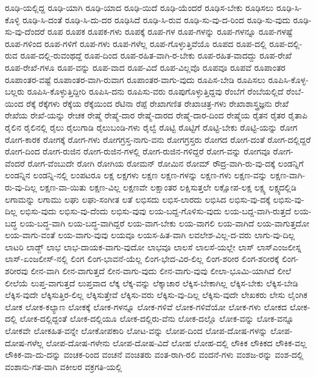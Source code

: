 {ರೂಢಿ-ಯಲ್ಲಿದ್ದ
ರೂಢಿ-ಯಾಗಿ
ರೂಢಿ-ಯಾದ
ರೂಢಿ-ಯಿದೆ
ರೂಢಿ-ಯೆಂದರೆ
ರೂಢಿಸ-ಬೇಕು
ರೂಢಿಸಲು
ರೂಢಿ-ಸಿ-ಕೊಳ್ಳಿ
ರೂಢಿ-ಸಿ-ದಂತೆ
ರೂಢಿ-ಸಿ-ದು-ದರ
ರೂಢಿಸಿದೆ
ರೂಢಿ-ಸಿ-ರುವ
ರೂಢಿ-ಸು-ವು-ದ-ರಿಂದ
ರೂಢಿ-ಸು-ವುದು
ರೂಢಿ-ಸು-ವು-ದೆಂದರೆ
ರೂಪ
ರೂಪಕ
ರೂಪಕ-ಗಳು
ರೂಪಕ್ಕೆ
ರೂಪ-ಗಳ
ರೂಪ-ಗಳನ್ನು
ರೂಪ-ಗಳನ್ನೂ
ರೂಪ-ಗಳಷ್ಟೆ
ರೂಪ-ಗಳಿಂದ
ರೂಪ-ಗಳಿಗೆ
ರೂಪ-ಗಳು
ರೂಪ-ಗಳೆಲ್ಲ
ರೂಪ-ಗೊಳ್ಳುತ್ತಿವೆಯೊ
ರೂಪದ
ರೂಪ-ದಲ್ಲಿ
ರೂಪ-ದಲ್ಲಿ-ರುವ
ರೂಪ-ದಲ್ಲಿ-ರುವಂಥದ್ದೆ
ರೂಪ-ದಿಂದ
ರೂಪ-ರಹಿತ-ವಾಗಿ-ರ-ಬೇಕು
ರೂಪ-ರಹಿತ-ವಾದದ್ದು
ರೂಪ-ರೇಖೆ
ರೂಪ-ರೇಖೆ-ಗಳೂ
ರೂಪ-ವನ್ನು
ರೂಪ-ವಾದ
ರೂಪ-ವಿದೆ
ರೂಪ-ವಿಲ್ಲವೊ
ರೂಪವೂ
ರೂಪವೆ
ರೂಪಾಂತರ
ರೂಪಾಂತರ-ವಷ್ಟೆ
ರೂಪಾಂತರ-ವಾಗಿ-ರುವಾಗ
ರೂಪಾಂತರ-ವಾಗು-ವುದು
ರೂಪಿಸ-ಬೇಡಿ
ರೂಪಿಸಲು
ರೂಪಿಸಿ-ಕೊಳ್ಳ-ಬಲ್ಲರು
ರೂಪಿಸಿ-ಕೊಳ್ಳುತ್ತಿದ್ದೀರಿ
ರೂಪಿಸಿ-ದನು
ರೂಪಿಸು-ವರು
ರೂಪುಗೊಳ್ಳುತ್ತಿದ್ದವು
ರೆಂಬೆಗೆ
ರೆಂಬೆಯಲ್ಲಿದೆ
ರೆಂಬೆ-ಯಿಂದ
ರೆಕ್ಕೆ
ರೆಕ್ಕೆಗಳು
ರೆಕ್ಕೆಯ
ರೆಕ್ಕೆಯಿಂದ
ರೆಟಿನಾ
ರೆಪ್ಪೆ
ರೇಖಾಗಣಿತ
ರೇಖಾಚಿತ್ರ-ಗಳು
ರೇಖಾಶಾಸ್ತ್ರಜ್ಞನು
ರೇಖೆ
ರೇಖೆಯ
ರೇಖೆ-ಯನ್ನು
ರೇಚಕ
ರೇಷ್ಮೆ
ರೇಷ್ಮೆ-ದಾರ
ರೇಷ್ಮೆ-ದಾರದ
ರೇಷ್ಮೆ-ದಾರ-ದಿಂದ
ರೇಷ್ಮೆಯ
ರೈತನ
ರೈತರ
ರೈತಾಪಿ
ರೈಲಿನ
ರೈಲಿನಲ್ಲಿ
ರೈಲು
ರೈಲುಗಾಡಿ
ರೈಲುಬಂಡಿ-ಗಳು
ರೈಲ್ವೆ
ರೊಟ್ಟಿ
ರೊಟ್ಟಿಗೆ
ರೊಟ್ಟಿ-ಬೇಕು
ರೊಟ್ಟಿ-ಯನ್ನು
ರೋಗ
ರೋಗ-ಕಾರಕ
ರೋಗಕ್ಕೆ
ರೋಗ-ಗಳು
ರೋಗಗ್ರಸ್ತ-ನಾಗು-ವನು
ರೋಗಗ್ರಸ್ತರು
ರೋಗದ
ರೋಗ-ದಂತೆ
ರೋಗ-ದಲ್ಲಿದ್ದರೆ
ರೋಗ-ದಿಂದ
ರೋಗ-ರುಜಿನ
ರೋಗ-ರುಜಿನ-ಗಳಲ್ಲಿ
ರೋಗ-ರುಜಿನ-ಗಳಿದ್ದರೆ
ರೋಗ-ವನ್ನು
ರೋಗವೂ
ರೋಗ-ವೆಂದರೆ
ರೋಗ-ವೆಂಬುದೇ
ರೋಗಿ
ರೋಗಿಯ
ರೋಮನ್
ರೋಮಿನ
ರೋಮ್
ರೌದ್ರ-ವಾಗಿ-ರು-ವು-ದಕ್ಕೆ
ಲಂಡನ್ನಿಗೆ
ಲಂಡನ್ನಿನ
ಲಂಡನ್ನಿ-ನಲ್ಲಿ
ಲಂಪಟರೂ
ಲಕ್ಷ
ಲಕ್ಷಗಳು
ಲಕ್ಷಣ
ಲಕ್ಷಣ-ಗಳನ್ನು
ಲಕ್ಷಣ-ಗಳು
ಲಕ್ಷಣ-ವನ್ನು
ಲಕ್ಷಣ-ವಾಗಿ-ರು-ವು-ದಿಲ್ಲ
ಲಕ್ಷಣ-ವಾ-ಯಿತು
ಲಕ್ಷಣ-ವಿಲ್ಲ
ಲಕ್ಷಣವೇ
ಲಕ್ಷಾಂತರ
ಲಕ್ಷಿಸುತ್ತಲೇ
ಲಕ್ಷೋಪ-ಲಕ್ಷ
ಲಕ್ಷ್ಯ
ಲಕ್ಷ್ಯದಲ್ಲಿಡಿ
ಲಗಾಮನ್ನು
ಲಗಾಮು
ಲಘು
ಲಘು-ಸಂಗೀತ
ಲತೆ
ಲಭಿಸದು
ಲಭಿಸ-ಲಾರದು
ಲಭಿಸಿದ
ಲಭಿಸು-ವು-ದಕ್ಕೆ
ಲಭಿಸು-ವು-ದಿಲ್ಲ
ಲಭಿಸು-ವುದು
ಲಭಿಸು-ವು-ದೆಂದು
ಲಭಿಸು-ವುವು
ಲಯ-ಬದ್ದ-ಗೊಳಿಸು-ವುದು
ಲಯ-ಬದ್ದ-ವಾಗಿ-ರುತ್ತದೆ
ಲಯ-ಬದ್ಧ
ಲಯ-ಬದ್ಧ-ವಾಗಿ
ಲಯ-ಬದ್ಧ-ವಾಗಿದ್ದರೆ
ಲಯ-ವಾಗ-ಬೇಕು
ಲಯ-ವಾಗಲಿ
ಲಯ-ವಾಗಿದೆ
ಲಯ-ವಾಗುತ್ತದೋ
ಲಯ-ವಾಗು-ವಂತೆ
ಲಯ-ವಾಗು-ವುವು
ಲಯವೂ
ಲಯಸ-ಹಿತ-ವಾಗಿ
ಲವಲೇಶ-ವಿಲ್ಲ-ದ-ವರು
ಲಾಗು-ವು-ದಿಲ್ಲ
ಲಾಟರಿ
ಲಾಡ್ಜ್
ಲಾಭ
ಲಾಭ-ದಾಯಕ-ವಾಗು-ವುದೋ
ಲಾಭವೂ
ಲಾಲಸೆ
ಲಾಲಸೆ-ಯಲ್ಲೇ
ಲಾಸ್
ಲಾಸ್ಎಂಜಲೀಸ್ನ
ಲಾಸ್-ಏಂಜಲೀಸ್-ನಲ್ಲಿ
ಲಿಂಗ
ಲಿಂಗ-ಭಾವನೆ-ಯೆಲ್ಲ
ಲಿಂಗ-ಭೇದ-ವಿರ-ಲಿಲ್ಲ
ಲಿಂಗ-ಶರೀರ
ಲಿಂಗ-ಶರೀರಕ್ಕೆ
ಲಿಂಗ-ಶರೀರವು
ಲೀನ-ವಾಗಿ
ಲೀನ-ವಾಗುತ್ತದೆ
ಲೀನ-ವಾಗು-ವುದು
ಲೀನ-ವಾಗು-ವುವು
ಲೀಲಾ-ಭೂಮಿ-ಯಾಗಿದೆ
ಲೀಲೆ
ಲೀಲೆಯೆ
ಲುಪ್ತ-ವಾಗುತ್ತದೆ
ಲುಪ್ತವಾದ
ಲೆಕ್ಕ
ಲೆಕ್ಕ-ವನ್ನು
ಲೆಕ್ಕಾಚಾರ
ಲೆಕ್ಕಿಸ-ಬೇಕಾಗಿಲ್ಲ
ಲೆಕ್ಕಿಸ-ಬೇಕು
ಲೆಕ್ಕಿಸ-ಬೇಡಿ
ಲೆಕ್ಕಿಸ-ವುದೇ
ಲೆಕ್ಕಿಸುತ್ತಿರ-ಲಿಲ್ಲ
ಲೆಕ್ಕಿಸುತ್ತೇವೆ
ಲೆಕ್ಕಿಸು-ವರು
ಲೆಕ್ಕಿಸು-ವು-ದಿಲ್ಲ
ಲೆಕ್ಕಿಸು-ವುದೇ
ಲೇಖಕರು
ಲೇಸು
ಲೈಂಗಿಕ
ಲೋಕ
ಲೋಕ-ಕಲ್ಯಾಣ
ಲೋಕಕ್ಕೆ
ಲೋಕ-ಗಳನ್ನೂ
ಲೋಕ-ಗಳಿವೆ
ಲೋಕ-ಗಳಿವೆಯೋ
ಲೋಕ-ಗಳು
ಲೋಕದ
ಲೋಕ-ದಲ್ಲಿ
ಲೋಕ-ದಲ್ಲಿದ್ದಂತೆ
ಲೋಕ-ದಲ್ಲಿಯೂ
ಲೋಕ-ದಲ್ಲಿರು-ವೆನು
ಲೋಕ-ದಲ್ಲೊ
ಲೋಕ-ವನ್ನು
ಲೋಕ-ವನ್ನೂ
ಲೋಕವೇ
ಲೋಕಹಿತ-ವನ್ನೇ
ಲೋಕೋಪಕಾರಿ
ಲೋಟ-ವನ್ನು
ಲೋಪ-ದಿಂದ
ಲೋಪ-ದೋಷ-ಗಳನ್ನು
ಲೋಪ-ದೋಷ-ಗಳೆಲ್ಲ
ಲೋಪ-ದೋಷ-ಗಳೇನು
ಲೋಪ-ದೋಷ-ವಿದೆ
ಲೋಹ
ಲೋಹ-ದಲ್ಲಿ
ಲೌಕಿಕ
ಲೌಕಿಕದ
ಲೌಕಿಕ-ವಲ್ಲ
ಲೌಕಿಕ-ವಾ-ದು-ದನ್ನು
ವಂಚಕ-ರಿಂದ
ವಂಚನೆ
ವಂಚಿತರು
ವಂತ-ರಾಗಿ-ರಲಿ
ವಂದನೆ-ಗಳು
ವಂಶಜ-ರನ್ನು
ವಂಶ-ದಲ್ಲಿ
ವಂಶಾನು-ಗತ-ವಾಗಿ
ವಕೀಲರ
ವಕ್ರಗತಿ-ಯಲ್ಲಿ
}
